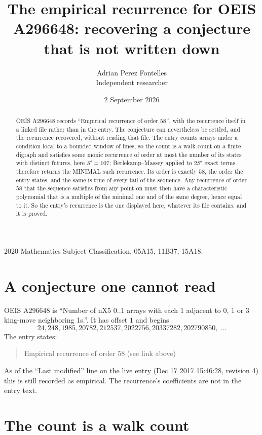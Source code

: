 \documentclass[11pt,a4paper]{article}
\title{The empirical recurrence for OEIS A296648: recovering a conjecture that is not written down}
\author{Adrian Perez Fontelles\\ \small Independent researcher}
\date{2 September 2026}
\theoremstyle{plain}
\theoremstyle{definition}
\begin{document}
\maketitle

\begin{abstract}
OEIS A296648 records ``Empirical recurrence of order $58$'', with the recurrence itself in a
linked file rather than in the entry. The conjecture can nevertheless be settled, and the
recurrence recovered, without reading that file. The entry counts arrays under a condition
local to a bounded window of lines, so the count is a walk count on a finite digraph and
satisfies some monic recurrence of order at most the number of its states with distinct
futures, here $S'=107$; Berlekamp--Massey applied to $2S'$ exact
terms therefore returns the MINIMAL such recurrence. Its order is exactly $58$, the order
the entry states, and the same is true of every tail of the sequence. Any recurrence of order
$58$ that the sequence satisfies from any point on must then have a characteristic
polynomial that is a multiple of the minimal one and of the same degree, hence equal to it. So
the entry's recurrence is the one displayed here, whatever its file contains, and it is
proved.
\end{abstract}

\noindent\small 2020 Mathematics Subject Classification. 05A15, 11B37, 15A18.\normalsize

\section{A conjecture one cannot read}

OEIS A296648 is ``Number of nX5 0..1 arrays with each 1 adjacent to 0, 1 or 3 king-move neighboring 1s.''. It has offset $1$ and begins
\[
24, 248, 1985, 20782, 212537, 2022756, 20337282, 202790850,\ \dots
\]
The entry states:
\begin{quote}
Empirical recurrence of order 58 (see link above)
\end{quote}
As of the ``Last modified'' line on the live entry (Dec 17 2017 15:46:28, revision 4) this is still
recorded as empirical. The recurrence's coefficients are not in the entry text.

\section{The count is a walk count}
\end{document}

